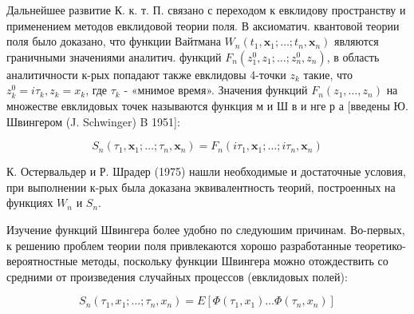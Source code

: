 \documentclass[10pt]{article}
\begin{document}
Дальнейшее развитие К. к. т. П. связано с переходом к евклидову пространству и применением методов евклидовой теории поля. В аксиоматич. квантовой теории поля было доказано, что функции Вайтмана $W_{n}\left(t_{1}, \boldsymbol{x}_{1} ; \ldots ; t_{n}, \boldsymbol{x}_{n}\right)$ являются граничными значениями аналитич. функций $F_{n}\left(z_{1}^{0}, z_{1} ; \ldots ; z_{n}^{0}, z_{n}\right)$, в область аналитичности к-рых попадают также евклидовы 4-точки $z_{k}$ такие, что $z_{k}^{0}=i \tau_{k}, z_{k}=x_{k}$, где $\tau_{k}$ - «мнимое время». Значения функций $F_{n}\left(z_{1}, \ldots, z_{n}\right)$ на множестве евклидовых точек называются функция м и Ш в и нге р а [введены Ю. Швингером (J. Schwinger) B 1951]:



\[

S_{n}\left(\tau_{1}, \boldsymbol{x}_{1} ; \ldots ; \tau_{n}, \boldsymbol{x}_{n}\right)=F_{n}\left(i \tau_{1}, \boldsymbol{x}_{1} ; \ldots ; i \tau_{n}, \boldsymbol{x}_{n}\right)

\]



К. Остервальдер и Р. Шрадер (1975) нашли необходимые и достаточные условия, при выполнении к-рых была доказана эквивалентность теорий, построенных на функциях $W_{n}$ и $S_{n}$.



Изучение функций Швингера более удобно по следуюшим причинам. Во-первых, к решению проблем теории поля привлекаются хорошо разработанные теоретико-вероятностные методы, поскольку функции Швингера можно отождествить со средними от произведения случайных процессов (евклидовых полей):



\[

S_{n}\left(\tau_{1}, x_{1} ; \ldots ; \tau_{n}, x_{n}\right)=E\left[\Phi\left(\tau_{1}, x_{1}\right) \ldots \Phi\left(\tau_{n}, x_{n}\right)\right]

\]
\end{document}
